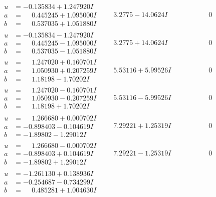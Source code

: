 \documentclass[1p]{elsarticle_modified}
\theoremstyle{definition}
\begin{document}
$$\begin{array}{c|c|c}
\begin{aligned}
u &= -0.135834 + 1.247920 I \\
a &= \phantom{-}0.445245 + 1.095000 I \\
b &= \phantom{-}0.537035 + 1.051880 I\end{aligned}
 & \phantom{-}3.2775 - 14.0624 I & \phantom{-0.000000 } 0 \\ \hline\begin{aligned}
u &= -0.135834 - 1.247920 I \\
a &= \phantom{-}0.445245 - 1.095000 I \\
b &= \phantom{-}0.537035 - 1.051880 I\end{aligned}
 & \phantom{-}3.2775 + 14.0624 I & \phantom{-0.000000 } 0 \\ \hline\begin{aligned}
u &= \phantom{-}1.247020 + 0.160701 I \\
a &= \phantom{-}1.050930 + 0.207259 I \\
b &= \phantom{-}1.18198 - 1.70202 I\end{aligned}
 & \phantom{-}5.53116 + 5.99526 I & \phantom{-0.000000 } 0 \\ \hline\begin{aligned}
u &= \phantom{-}1.247020 - 0.160701 I \\
a &= \phantom{-}1.050930 - 0.207259 I \\
b &= \phantom{-}1.18198 + 1.70202 I\end{aligned}
 & \phantom{-}5.53116 - 5.99526 I & \phantom{-0.000000 } 0 \\ \hline\begin{aligned}
u &= \phantom{-}1.266680 + 0.000702 I \\
a &= -0.898403 - 0.104619 I \\
b &= -1.89802 - 1.29012 I\end{aligned}
 & \phantom{-}7.29221 + 1.25319 I & \phantom{-0.000000 } 0 \\ \hline\begin{aligned}
u &= \phantom{-}1.266680 - 0.000702 I \\
a &= -0.898403 + 0.104619 I \\
b &= -1.89802 + 1.29012 I\end{aligned}
 & \phantom{-}7.29221 - 1.25319 I & \phantom{-0.000000 } 0 \\ \hline\begin{aligned}
u &= -1.261130 + 0.138936 I \\
a &= -0.254687 - 0.734299 I \\
b &= \phantom{-}0.485281 + 1.004630 I\end{aligned}

\end{array}$$
\end{document}
